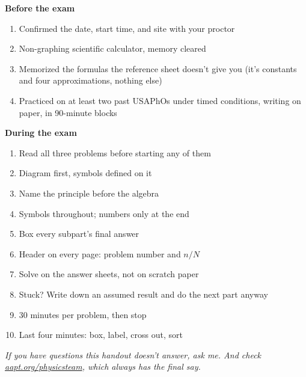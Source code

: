 \documentclass[11pt]{article}
\begin{document}
\begin{keybox}
\textbf{Before the exam}
\begin{enumerate}\setlength{\itemsep}{2pt}
\item[$\square$] Confirmed the date, start time, and site with your proctor
\item[$\square$] Non-graphing scientific calculator, memory cleared
\item[$\square$] Memorized the formulas the reference sheet doesn't give you (it's constants
and four approximations, nothing else)
\item[$\square$] Practiced on at least two past USAPhOs under timed conditions, writing on
paper, in 90-minute blocks
\end{enumerate}

\textbf{During the exam}
\begin{enumerate}\setlength{\itemsep}{2pt}
\item[$\square$] Read all three problems before starting any of them
\item[$\square$] Diagram first, symbols defined on it
\item[$\square$] Name the principle before the algebra
\item[$\square$] Symbols throughout; numbers only at the end
\item[$\square$] Box every subpart's final answer
\item[$\square$] Header on every page: problem number and $n/N$
\item[$\square$] Solve on the answer sheets, not on scratch paper
\item[$\square$] Stuck? Write down an assumed result and do the next part anyway
\item[$\square$] 30 minutes per problem, then stop
\item[$\square$] Last four minutes: box, label, cross out, sort
\end{enumerate}
\end{keybox}

\vspace{0.5em}
\begin{center}
\emph{If you have questions this handout doesn't answer, ask me. And check
\href{https://www.aapt.org/physicsteam/}{aapt.org/physicsteam}, which always has the final
say.}
\end{center}
\end{document}
